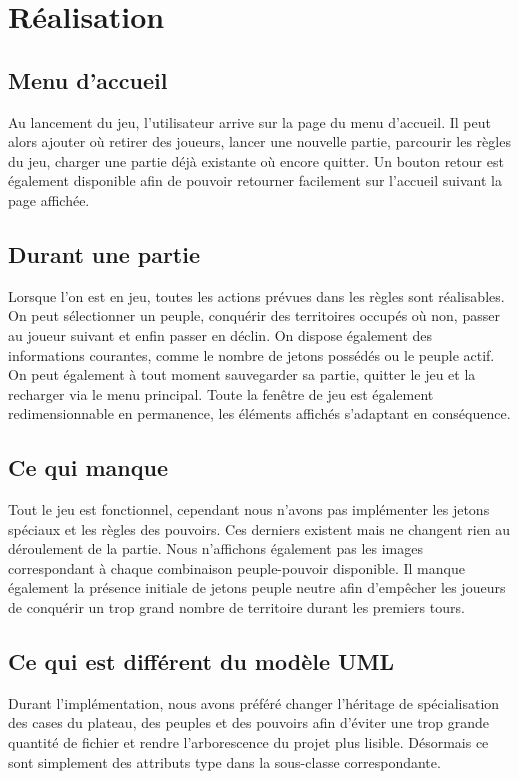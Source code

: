 \documentclass[a4paper]{report}
\begin{document}
\chapter{Réalisation}
\section{Menu d'accueil}
\par
Au lancement du jeu, l'utilisateur arrive sur la page du menu d'accueil. Il peut alors ajouter où retirer des joueurs, lancer une nouvelle partie, parcourir les règles du jeu, charger une partie déjà existante où encore quitter. Un bouton retour est également disponible afin de pouvoir retourner facilement sur l'accueil suivant la page affichée.
\section{Durant une partie}
\par
Lorsque l'on est en jeu, toutes les actions prévues dans les règles sont réalisables. On peut sélectionner un peuple, conquérir des territoires occupés où non, passer au joueur suivant et enfin passer en déclin. On dispose également des informations courantes, comme le nombre de jetons possédés ou le peuple actif. On peut également à tout moment sauvegarder sa partie, quitter le jeu et la recharger via le menu principal. Toute la fenêtre de jeu est également redimensionnable en permanence, les éléments affichés s'adaptant en conséquence.
\section{Ce qui manque}
\par
Tout le jeu est fonctionnel, cependant nous n'avons pas implémenter les jetons spéciaux et les règles des pouvoirs. Ces derniers existent mais ne changent rien au déroulement de la partie. Nous n'affichons également pas les images correspondant à chaque combinaison peuple-pouvoir disponible. Il manque également la présence initiale de jetons peuple neutre afin d'empêcher les joueurs de conquérir un trop grand nombre de territoire durant les premiers tours.
\newpage
\section{Ce qui est différent du modèle UML}
\par
Durant l'implémentation, nous avons préféré changer l'héritage de spécialisation des cases du plateau, des peuples et des pouvoirs afin d'éviter une trop grande quantité de fichier et rendre l'arborescence du projet plus lisible. Désormais ce sont simplement des attributs type dans la sous-classe correspondante.
\end{document}
